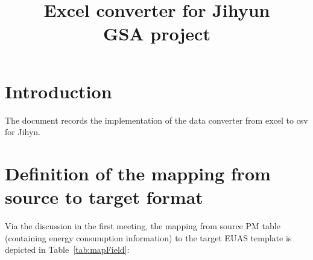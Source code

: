 \documentclass[12pt]{article}
\newcommand{\tref}[1]{Table~\ref{#1}}
\begin{document}
\title{Excel converter for Jihyun\\
       \large GSA project}
\maketitle
\tableofcontents
\newpage
\section{Introduction}\label{sec:intro}
The document records the implementation of the data converter from
excel to csv for Jihyn. 

\section{Definition of the mapping from source to target format}
Via the discussion in the first meeting, the mapping from source PM
table (containing energy consumption information) to the target EUAS
template is depicted in \tref{tab:mapField}:
\end{document}
